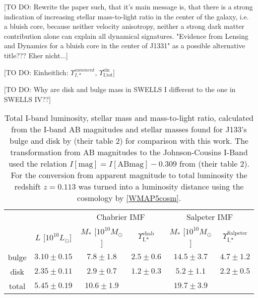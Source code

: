 [TO DO: Rewrite the paper such, that it's main message is, that there is a strong indication of increasing stellar mass-to-light ratio in the center of the galaxy, i.e. a bluish core, because neither velocity anisotropy, neither a strong dark matter contribution alone can explain all dynamical signatures. "Evidence from Lensing and Dynamics for a bluish core in the center of J1331" as a possible alternative title??? Eher nicht...]

[TO DO: Einheitlich: $\Upsilon_{I,*}^{comment}$, $\Upsilon_\text{I,tot}^\text{ein}$]

[TO DO: Why are disk and bulge mass in SWELLS I different to the one in SWELLS IV??]

\begin{table*}
\centering
\begin{tabular}{cccccc}
\hline\hline
& & \multicolumn{2}{c}{Chabrier IMF} & \multicolumn{2}{c}{Salpeter IMF}\\
      &  $L$ [$10^{10}L_{\odot}$]                & $M_*$ [$10^{10}M_\odot$]               & $\Upsilon_\text{I,*}^\text{chab}$ & $M_*$ [$10^{10}M_\odot$] & $\Upsilon_\text{I,*}^\text{Salpeter}$ \\\hline
bulge &   $3.10 \pm 0.15 $  & $7.8 \pm 1.8$ & $2.5 \pm 0.6$ & $14.5 \pm 3.7 $ & $4.7 \pm 1.2$ \\
disk  &   $2.35 \pm 0.11 $  & $2.9 \pm 0.7$ & $1.2 \pm 0.3$ & $5.2 \pm 1.1$ & $2.2 \pm 0.5$ \\
total &   $5.45 \pm 0.19$ & $10.6 \pm 1.9$& & $19.7 \pm 3.9$&\\\hline
\end{tabular}
\caption{Total I-band luminosity, stellar mass and mass-to-light ratio, calculated from the I-band AB magnitudes and stellar masses found for J133's bulge and disk by \citet{SWELLS} (their table 2) for comparison with this work. The transformation from AB magnitudes to the Johnson-Cousins I-Band used the relation $I[\text{mag}] = I[\text{ABmag}] - 0.309$ from \citet{FG1994} (their table 2). For the conversion from apparent magnitude to total luminosity the redshift $z=0.113$ \citet{SWELLSIII} was turned into a luminosity distance using the cosmology by \ref{WMAP5cosm}. }
\label{tab:previousresults}
\end{table*}